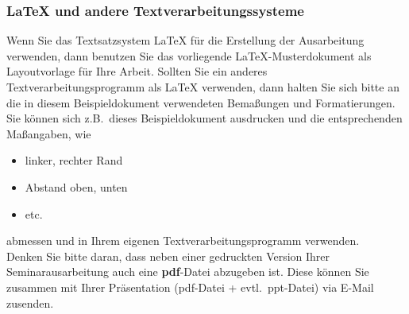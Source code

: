 \subsubsection{{\LaTeX} und andere Textverarbeitungssysteme}
Wenn Sie das Textsatzsystem {\LaTeX} für die Erstellung der Ausarbeitung verwenden, dann benutzen Sie das vorliegende \LaTeX-Musterdokument als Layoutvorlage für Ihre Arbeit.
Sollten Sie ein anderes Textverarbeitungsprogramm als {\LaTeX} verwenden, dann halten Sie sich bitte an die in diesem Beispieldokument verwendeten Bemaßungen und Formatierungen.
Sie können sich z.B.~dieses Beispieldokument ausdrucken und die entsprechenden Maßangaben, wie 
\begin{itemize}
\item linker, rechter Rand
\item Abstand oben, unten
\item etc.
\end{itemize}
abmessen und in Ihrem eigenen Textverarbeitungsprogramm verwenden. \\
Denken Sie bitte daran, dass neben einer gedruckten Version Ihrer Seminarausarbeitung auch eine {\bf pdf}-Datei abzugeben ist.
Diese können Sie zusammen mit Ihrer Präsentation (pdf-Datei + evtl.~ppt-Datei) via E-Mail zusenden.
